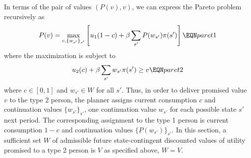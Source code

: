 





In terms of the pair of values
$(P(v),v)$,
 we can express the Pareto problem recursively as
$$ P(v) = \max_{c, \{w_{s'} \}_{s'} } \left[ u_1(1-c) 
   + \beta \sum_{s'} P(w_{s'}) \pi(s') \right] \EQN paret1 $$
where the maximization is subject to
$$ u_2(c) + \beta \sum_{s'} w_{s'} \pi(s') \geq v \EQN paret2 $$
where $c \in [0,1]$ and $w_{s'} \in W$ for all $s'$. 
Thus, in order to deliver promised value $v$ to the type 2
person, the planner assigns current consumption $c$
and continuation values $\{w_{s'}\}_{s'}$, one continuation
value $w_{s'}$ for each possible state $s'$ next period.
The corresponding assignment to the type 1 person is
current consumption $1-c$ and continuation values
$\{P(w_{s'})\}_{s'}$. In this section, a sufficient
set $W$ of admissible future state-contingent discounted
values of utility promised to a type 2 person is $V$ as 
specified above, $W=V$.


